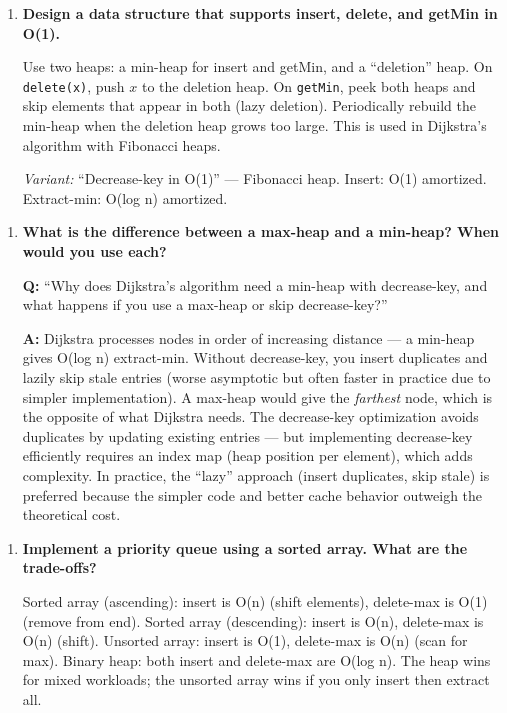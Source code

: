 \begin{enumerate}
\item \textbf{Design a data structure that supports insert, delete, and getMin in O(1).}

Use two heaps: a min-heap for insert and getMin, and a ``deletion'' heap. On \texttt{delete(x)}, push $x$ to the deletion heap. On \texttt{getMin}, peek both heaps and skip elements that appear in both (lazy deletion). Periodically rebuild the min-heap when the deletion heap grows too large. This is used in Dijkstra's algorithm with Fibonacci heaps.

\textit{Variant:} ``Decrease-key in O(1)'' — Fibonacci heap. Insert: O(1) amortized. Extract-min: O(log n) amortized.
\end{enumerate}

\begin{enumerate}
\item \textbf{What is the difference between a max-heap and a min-heap? When would you use each?}

\textbf{Q:} ``Why does Dijkstra's algorithm need a min-heap with decrease-key, and what happens if you use a max-heap or skip decrease-key?''

\textbf{A:} Dijkstra processes nodes in order of increasing distance --- a min-heap gives O(log n) extract-min. Without decrease-key, you insert duplicates and lazily skip stale entries (worse asymptotic but often faster in practice due to simpler implementation). A max-heap would give the \emph{farthest} node, which is the opposite of what Dijkstra needs. The decrease-key optimization avoids duplicates by updating existing entries --- but implementing decrease-key efficiently requires an index map (heap position per element), which adds complexity. In practice, the ``lazy'' approach (insert duplicates, skip stale) is preferred because the simpler code and better cache behavior outweigh the theoretical cost.
\end{enumerate}

\begin{enumerate}
\item \textbf{Implement a priority queue using a sorted array. What are the trade-offs?}

Sorted array (ascending): insert is O(n) (shift elements), delete-max is O(1) (remove from end). Sorted array (descending): insert is O(n), delete-max is O(n) (shift). Unsorted array: insert is O(1), delete-max is O(n) (scan for max). Binary heap: both insert and delete-max are O(log n). The heap wins for mixed workloads; the unsorted array wins if you only insert then extract all.
\end{enumerate}

